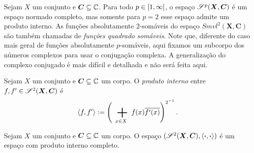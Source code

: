 Sejam $X$ um conjunto e $\bm C \subseteq \mathbb{C}$. Para todo $p \in \left[{1},{\infty}\right]$, o espaço $\mathscr{S}^p(\bm X,\bm C)$ é um espaço normado completo, mas somente para $p=2$ esse espaço admite um produto interno. As funções absolutamente $2$-somáveis do espaço $Smvl^2(\bm X,\bm C)$ são também chamadas de \emph{funções quadrado somáveis}. Note que, diferente do caso mais geral de funções absolutamente $p$-somáveis, aqui fixamos um subcorpo dos números complexos para usar o conjugação complexa. A generalização do complexo conjugado é mais difícil e detalhada e não será feita aqui.

\begin{definition}
Sejam $X$ um conjunto e $\bm C \subseteq \mathbb{C}$ um corpo. O \emph{produto interno} entre $f,f' \in \mathscr{S}^2(\bm X,\bm C)$ é
	\begin{equation*}
	\inte{f}{f'} := \left( \sum_{x \in X} f(x)\overline{f'(x)} \right)^{2\inv}.
	\end{equation*}
\end{definition}

\begin{proposition}
Sejam $X$ um conjunto e $\bm C \subseteq \mathbb{C}$ um corpo. O espaço $(\mathscr{S}^2(\bm X,\bm C),\left\langle{\bm{\cdot}},{\bm{\cdot}}\right\rangle)$ é um espaço com produto interno completo.
\end{proposition}